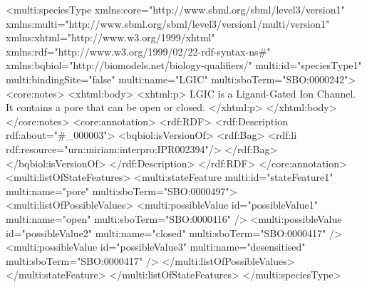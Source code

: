 \begin{example}
<multi:speciesType xmlns:core="http://www.sbml.org/sbml/level3/version1"
                   xmlns:multi="http://www.sbml.org/sbml/level3/version1/multi/version1" 
                   xmlns:xhtml="http://www.w3.org/1999/xhtml"
                   xmlns:rdf="http://www.w3.org/1999/02/22-rdf-syntax-ns#" 
                   xmlns:bqbiol="http://biomodels.net/biology-qualifiers/"
                   multi:id="speciesType1"
                   multi:bindingSite="false" 
                   multi:name="LGIC" 
                   multi:sboTerm="SBO:0000242">
  <core:notes>
    <xhtml:body>
      <xhtml:p> 
        LGIC is a Ligand-Gated Ion Channel. It contains a pore that can be open or closed.
      </xhtml:p>
    </xhtml:body>
  </core:notes>
  <core:annotation>
    <rdf:RDF>
      <rdf:Description rdf:about="#_000003">
        <bqbiol:isVersionOf>
          <rdf:Bag>
            <rdf:li rdf:resource="urn:miriam:interpro:IPR002394"/>
          </rdf:Bag>
        </bqbiol:isVersionOf>
      </rdf:Description>
    </rdf:RDF>
  </core:annotation>
  <multi:listOfStateFeatures>
    <multi:stateFeature multi:id="stateFeature1"
                        multi:name="pore"
                        multi:sboTerm="SBO:0000497">
      <multi:listOfPossibleValues>
        <multi:possibleValue id="possibleValue1"
                             multi:name="open"
                             multi:sboTerm="SBO:0000416" />
        <multi:possibleValue id="possibleValue2"
                             multi:name="closed"
                             multi:sboTerm="SBO:0000417" />
        <multi:possibleValue id="possibleValue3"
                             multi:name="desensitised"
                             multi:sboTerm="SBO:0000417" />
      </multi:listOfPossibleValues>
    </multi:stateFeature>
  </multi:listOfStateFeatures>
</multi:speciesType>
\end{example}
